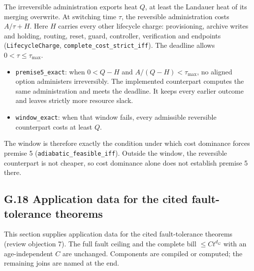\documentclass[
]{article}
\providecommand{\tightlist}{%
  \setlength{\itemsep}{0pt}\setlength{\parskip}{0pt}}
\begin{document}
The irreversible administration exports heat \(Q\), at least the
Landauer heat of its merging overwrite. At switching time \(\tau\), the
reversible administration costs \(A/\tau+H\). Here \(H\) carries every
other lifecycle charge: provisioning, archive writes and holding,
routing, reset, guard, controller, verification and endpoints
(\texttt{LifecycleCharge},
\texttt{c\allowbreak{}o\allowbreak{}m\allowbreak{}p\allowbreak{}l\allowbreak{}e\allowbreak{}t\allowbreak{}e\allowbreak{}\_\allowbreak{}c\allowbreak{}o\allowbreak{}s\allowbreak{}t\allowbreak{}\_\allowbreak{}s\allowbreak{}t\allowbreak{}r\allowbreak{}i\allowbreak{}c\allowbreak{}t\allowbreak{}\_\allowbreak{}i\allowbreak{}f\allowbreak{}f}).
The deadline allows \(0<\tau\le\tau_{\max}\).

\begin{itemize}
\tightlist
\item
  \texttt{premise5\_exact}: when \(0<Q-H\) and \(A/(Q-H)<\tau_{\max}\),
  no aligned option administers irreversibly. The implemented
  counterpart computes the same administration and meets the deadline.
  It keeps every earlier outcome and leaves strictly more resource
  slack.
\item
  \texttt{window\_exact}: when that window fails, every admissible
  reversible counterpart costs at least \(Q\).
\end{itemize}

The window is therefore exactly the condition under which cost dominance
forces premise 5
(\texttt{a\allowbreak{}d\allowbreak{}i\allowbreak{}a\allowbreak{}b\allowbreak{}a\allowbreak{}t\allowbreak{}i\allowbreak{}c\allowbreak{}\_\allowbreak{}f\allowbreak{}e\allowbreak{}a\allowbreak{}s\allowbreak{}i\allowbreak{}b\allowbreak{}l\allowbreak{}e\allowbreak{}\_\allowbreak{}i\allowbreak{}f\allowbreak{}f}).
Outside the window, the reversible counterpart is not cheaper, so cost
dominance alone does not establish premise 5 there.

\subsection{G.18 Application data for the cited fault-tolerance
theorems}\label{g.18-application-data-for-the-cited-fault-tolerance-theorems}

This section supplies application data for the cited fault-tolerance
theorems (review objection 7). The full fault ceiling and the complete
bill \(\le Ct^{d_G}\) with an age-independent \(C\) are unchanged.
Components are compiled or computed; the remaining joins are named at
the end.
\end{document}
